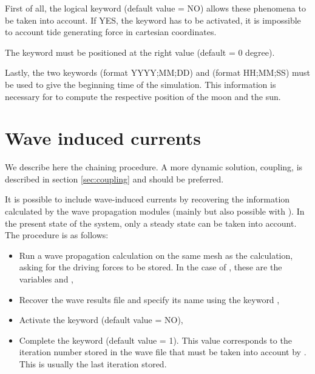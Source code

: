First of all, the logical keyword 
(default value = NO) allows these phenomena to be taken into account.
If YES, the keyword  has to be activated,
it is impossible to account tide generating force in cartesian coordinates.

The keyword  must be positioned at the right
value (default = 0 degree).

Lastly, the two keywords  (format YYYY;MM;DD)
and  (format HH;MM;SS) must be used
to give the beginning time of the simulation.
This information is necessary for  to compute the respective
position of the moon and the sun.


\section{Wave induced currents}

We describe here the chaining procedure.
A more dynamic solution, coupling, is described in section \ref{sec:coupling}
and should be preferred.

It is possible to include wave-induced currents by recovering the information
calculated by the wave propagation modules (mainly \tomawac but also possible
with \artemis).
In the present state of the system, only a steady state can be taken into
account.
The procedure is as follows:

\begin{itemize}
\item Run a wave propagation calculation on the same mesh as the 
calculation, asking for the driving forces to be stored.
In the case of \tomawac, these are the variables  and ,

\item Recover the wave results file and specify its name using the keyword
,

\item Activate the keyword  (default value = NO),

\item Complete the keyword 
(default value = 1).
This value corresponds to the iteration number stored in the wave file that must
be taken into account by . This is usually the last iteration stored.
\end{itemize}

